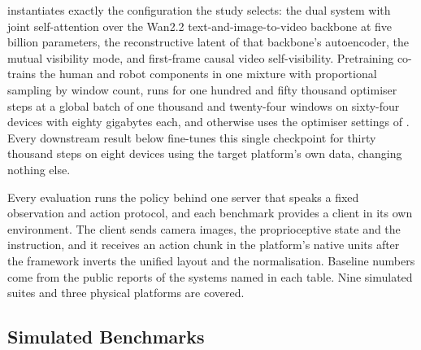 \sysa{} instantiates exactly the configuration the study selects: the dual system
with joint self-attention over the Wan2.2 text-and-image-to-video backbone at
five billion parameters, the reconstructive latent of that backbone's
autoencoder, the mutual visibility mode, and first-frame causal video
self-visibility. Pretraining co-trains the human and robot components in one
mixture with proportional sampling by window count, runs for one hundred and
fifty thousand optimiser steps at a global batch of one thousand and
twenty-four windows on sixty-four devices with eighty gigabytes each, and
otherwise uses the optimiser settings of . Every downstream
result below fine-tunes this single checkpoint for thirty thousand steps on eight
devices using the target platform's own data, changing nothing else.

Every evaluation runs the policy behind one server that speaks a fixed
observation and action protocol, and each benchmark provides a client in its own
environment. The client sends camera images, the proprioceptive state and the
instruction, and it receives an action chunk in the platform's native units after
the framework inverts the unified layout and the normalisation. Baseline numbers
come from the public reports of the systems named in each table. Nine simulated
suites and three physical platforms are covered.

\FloatBarrier

\subsection{Simulated Benchmarks}
\label{sec:sim}


